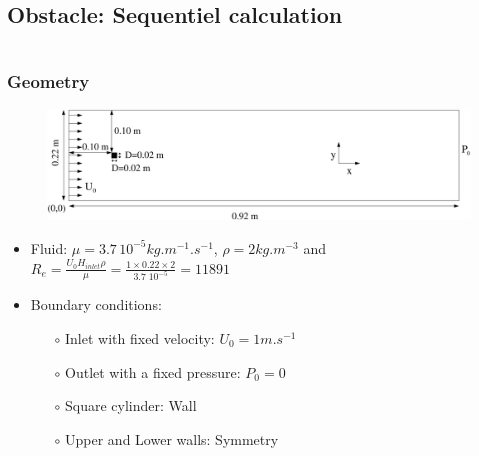 \documentclass[10pt]{beamer}
\begin{document}
\subsection{Obstacle: Sequentiel calculation}
\begin{frame}
\begin{columns}[c] 
\tableofcontents[sections={1-7},currentsection, currentsubsection]
\tableofcontents[sections={8-13},currentsection, currentsubsection]
\end{columns}
\end{frame}
\begin{frame}
\frametitle{Geometry}
\begin{block}{}

\begin{figure}
\includegraphics[width=1\textwidth]{PICTURES/Obstacle.pdf}
\end{figure}

\begin{itemize}
\item Fluid: $\mu=3.7 \, 10^{-5} kg.m^{-1}.s^{-1}$, $\rho=2 kg.m^{-3}$ and $R_e=\frac{U_0 H_{inlet} \rho}{\mu} = \frac{1 \times 0.22 \times 2}{3.7 \;10^{-5}} = 11 891$
\item Boundary conditions:\\
    \begin{itemize}
    \item [$\circ$] Inlet with fixed velocity: $U_0=1 m.s^{-1}$
    \item [$\circ$] Outlet with a fixed pressure: $P_0=0$
    \item [$\circ$] Square cylinder: Wall
    \item [$\circ$] Upper and Lower walls: Symmetry
    \end{itemize}
\end{itemize}

\end{block}
\end{frame}
\end{document}
